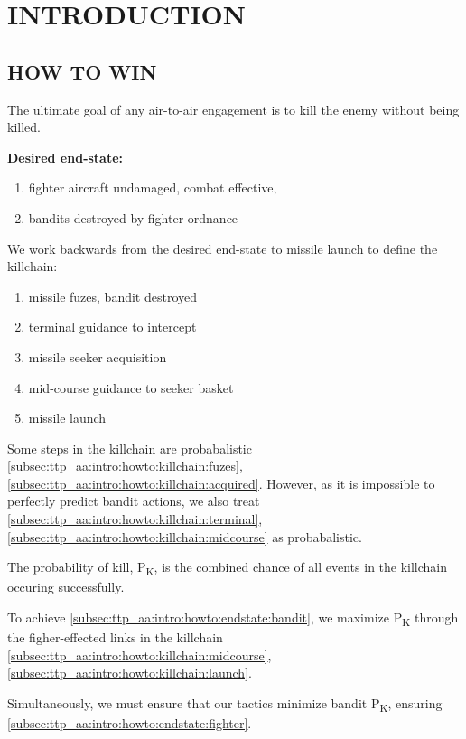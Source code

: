 \section{INTRODUCTION}
\subsection{HOW TO WIN}
\begin{tcoloritemize}
    \blueitem[Goal]
    The ultimate goal of any air-to-air engagement is to kill the enemy without being killed. 

    \medskip
    \textbf{Desired end-state:}
    \begin{enumerate}[label=\bfseries(\arabic*)]
        \item fighter aircraft undamaged, combat effective,
        \label{subsec:ttp_aa:intro:howto:endstate:fighter}
        \item bandits destroyed by fighter ordnance
        \label{subsec:ttp_aa:intro:howto:endstate:bandit}
    \end{enumerate}

    We work backwards from the desired end-state 
    to missile launch to define the killchain:
    \begin{enumerate}[label=\textbf{(\alph*)}]
        \item missile fuzes, bandit destroyed
        \label{subsec:ttp_aa:intro:howto:killchain:fuzes}
        \item terminal guidance to intercept
        \label{subsec:ttp_aa:intro:howto:killchain:terminal}
        \item missile seeker acquisition
        \label{subsec:ttp_aa:intro:howto:killchain:acquired}
        \item mid-course guidance to seeker basket
        \label{subsec:ttp_aa:intro:howto:killchain:midcourse}
        \item missile launch
        \label{subsec:ttp_aa:intro:howto:killchain:launch}
    \end{enumerate}

    Some steps in the killchain are probabalistic 
    \ref{subsec:ttp_aa:intro:howto:killchain:fuzes},
    \ref{subsec:ttp_aa:intro:howto:killchain:acquired}.
    However, as it is impossible to perfectly predict bandit actions, 
    we also treat 
    \ref{subsec:ttp_aa:intro:howto:killchain:terminal},
    \ref{subsec:ttp_aa:intro:howto:killchain:midcourse}
    as probabalistic.

    \medskip
    The probability of kill, P\textsubscript{K}, is the combined chance of all events in the killchain occuring successfully.

    To achieve \ref{subsec:ttp_aa:intro:howto:endstate:bandit},
    we maximize P\textsubscript{K} through the figher-effected links in the killchain
    \ref{subsec:ttp_aa:intro:howto:killchain:midcourse},
    \ref{subsec:ttp_aa:intro:howto:killchain:launch}.

    \medskip
    Simultaneously, we must ensure that our tactics minimize bandit P\textsubscript{K}, 
    ensuring \ref{subsec:ttp_aa:intro:howto:endstate:fighter}.
\end{tcoloritemize}


